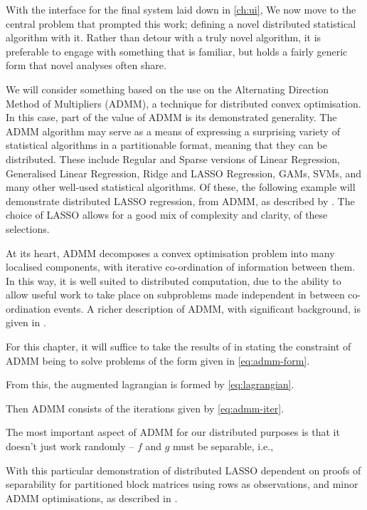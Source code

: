 With the interface for the final system laid down in \cref{ch:ui}, We now move to the central problem that prompted this work; defining a novel distributed statistical algorithm with it.
Rather than detour with a truly novel algorithm, it is preferable to engage with something that is familiar, but holds a fairly generic form that novel analyses often share.

We will consider something based on the use on the Alternating Direction Method of Multipliers (ADMM), a technique for distributed convex optimisation.
In this case, part of the value of ADMM is its demonstrated generality.
The ADMM algorithm may serve as a means of expressing a surprising variety of statistical algorithms in a partitionable format, meaning that they can be distributed.
These include Regular and Sparse versions of Linear Regression, Generalised Linear Regression, Ridge and LASSO Regression, GAMs, SVMs, and many other well-used statistical algorithms.
Of these, the following example will demonstrate distributed LASSO regression, from ADMM, as described by \textcite{mateos2010}.
The choice of LASSO allows for a good mix of complexity and clarity, of these selections.

At its heart, ADMM decomposes a convex optimisation problem into many localised components, with iterative co-ordination of information between them.
In this way, it is well suited to distributed computation, due to the ability to allow useful work to take place on subproblems made independent in between co-ordination events.
A richer description of ADMM, with significant background, is given in \textcite{boyd2011}.

For this chapter, it will suffice to take the results of \textcite{boyd2011} in stating the constraint of ADMM being to solve problems of the form given in \cref{eq:admm-form}.


From this, the augmented lagrangian is formed by \cref{eq:lagrangian}.


Then ADMM consists of the iterations given by \cref{eq:admm-iter}.


The most important aspect of ADMM for our distributed purposes is that it doesn't just work randomly -- \(f\) and \(g\) must be separable, i.e.,


With this particular demonstration of distributed LASSO dependent on proofs of separability for partitioned block matrices using rows as observations, and minor ADMM optimisations, as described in \textcite{boyd2011}.

